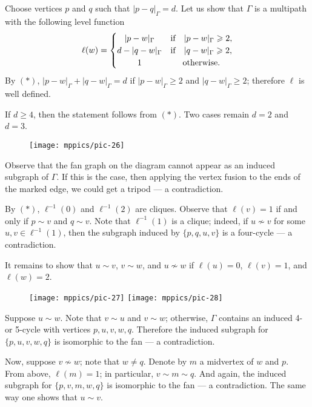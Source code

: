 \documentclass{article}
\def\parit#1{\medskip\noindent{\it #1}}
\begin{document}
Choose vertices $p$ and $q$ such that $|p-q|_\Gamma=d$.
Let us show that $\Gamma$ is a multipath with the following level function
\[\ell(w)=
\begin{cases}
\hfil |p-w|_\Gamma&\text{if}\quad |p-w|_\Gamma\geqslant 2,
\\
d-|q-w|_\Gamma&\text{if}\quad |q-w|_\Gamma\geqslant 2,
\\
\hfil 1&\hfil\text{otherwise.}
\end{cases}
\]
By $({*})$, $|p-w|_\Gamma+|q-w|_\Gamma=d$ if $|p-w|_\Gamma\geqslant 2$ and $|q-w|_\Gamma\geqslant 2$;
therefore $\ell$ is well defined.

If $d\geqslant 4$, then the statement follows from $({*})$.
Two cases remain $d=2$ and $d=3$.

\begin{wrapfigure}{r}{17 mm}
\vskip-6mm
\centering
\texttt{[image: mppics/pic-26]}
\vskip-2mm
\end{wrapfigure}

Observe that the fan graph on the diagram cannot appear as an induced subgraph of $\Gamma$.
If this is the case, then applying the vertex fusion to the ends of the marked edge, we could get a tripod --- a contradiction.

\parit{Case $d=2$.}
By $({*})$, $\ell^{-1}(0)$ and $\ell^{-1}(2)$ are cliques.
Observe that $\ell(v)=1$ if and only if $p\sim v$ and $q\sim v$.
Note that $\ell^{-1}(1)$ is a clique;
indeed, if $u\nsim v$ for some $u,v\in\ell^{-1}(1)$,
then the subgraph induced by $\{p,q,u,v\}$ is a four-cycle --- a contradiction.

It remains to show that $u\sim v$, $v\sim w$, and $u\nsim w$ if $\ell(u)=0$, $\ell(v)=1$, and $\ell(w)=2$.

\begin{wrapfigure}{r}{17 mm}
\vskip-2mm
\centering
\texttt{[image: mppics/pic-27]}
\vskip4mm
\texttt{[image: mppics/pic-28]}
\end{wrapfigure}

Suppose $u\sim w$. 
Note that $v\sim u$ and $v\sim w$; otherwise, $\Gamma$ contains an induced 4- or 5-cycle with vertices $p, u, v, w, q$.
Therefore the induced subgraph for $\{p,u,v,w,q\}$ is isomorphic to the fan --- a contradiction.

Now, suppose $v\nsim w$; note that $w\ne q$.
Denote by $m$ a midvertex of $w$ and $p$.
From above, $\ell(m)=1$; in particular, $v\sim m\sim q$.
And again, the induced subgraph for $\{p,v,m,w,q\}$ is isomorphic to the fan --- a contradiction.
The same way one shows that $u\sim v$.
\end{document}
